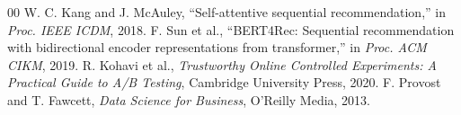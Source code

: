 \documentclass[conference]{IEEEtran}
\begin{document}
\begin{thebibliography}{00}
 W. C. Kang and J. McAuley, ``Self-attentive sequential recommendation,'' in \textit{Proc. IEEE ICDM}, 2018.
 F. Sun et al., ``BERT4Rec: Sequential recommendation with bidirectional encoder representations from transformer,'' in \textit{Proc. ACM CIKM}, 2019.
 R. Kohavi et al., \textit{Trustworthy Online Controlled Experiments: A Practical Guide to A/B Testing}, Cambridge University Press, 2020.
 F. Provost and T. Fawcett, \textit{Data Science for Business}, O'Reilly Media, 2013.
\end{thebibliography}
\end{document}
